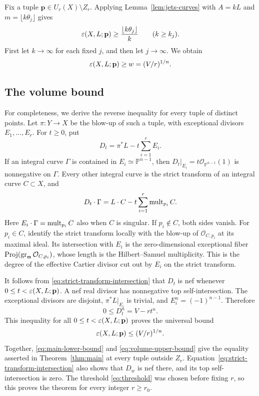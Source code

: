 Fix a tuple $\mathbf p\in U_r(X)\setminus Z_r$. Applying
Lemma~\ref{lem:jets-curves} with $A=kL$ and
$m=\lfloor k\theta_j\rfloor$ gives
\[
 \varepsilon(X,L;\mathbf p)\ge\frac{\lfloor k\theta_j\rfloor}{k}
 \qquad(k\ge k_j).
\]
First let $k\to\infty$ for each fixed $j$, and then let $j\to\infty$.
We obtain
\begin{equation}
 \label{eq:main-lower-bound}
 \varepsilon(X,L;\mathbf p)\ge w=(V/r)^{1/n}.
\end{equation}

\subsection{The volume bound}

For completeness, we derive the reverse inequality for every tuple of
distinct points. Let $\pi:Y\to X$ be the blow-up of such a tuple, with
exceptional divisors $E_1,\ldots,E_r$. For $t\ge0$, put
\[
 D_t=\pi^*L-t\sum_{i=1}^r E_i.
\]
If an integral curve $\Gamma$ is contained in $E_i\simeq\mathbb P^{n-1}$,
then $D_t|_{E_i}=t\mathcal O_{\mathbb P^{n-1}}(1)$ is nonnegative on
$\Gamma$. Every other integral curve is the strict transform of an
integral curve $C\subset X$, and
\begin{equation}
 \label{eq:strict-transform-intersection}
 D_t\cdot\Gamma=L\cdot C-t\sum_{i=1}^r\operatorname{mult}_{p_i}C.
\end{equation}
Here $E_i\cdot\Gamma=\operatorname{mult}_{p_i}C$ also when $C$ is singular. If
$p_i\notin C$, both sides vanish. For $p_i\in C$, identify the strict
transform locally with the blow-up of $\mathcal O_{C,p_i}$ at its maximal
ideal. Its intersection
with $E_i$ is the zero-dimensional exceptional fiber
$\operatorname{Proj}(\operatorname{gr}_{\mathfrak m}\mathcal O_{C,p_i})$,
whose length is the Hilbert--Samuel multiplicity. This is the degree of
the effective Cartier divisor cut out by $E_i$ on the strict transform.

It follows from \eqref{eq:strict-transform-intersection} that $D_t$ is
nef whenever $0\le t<\varepsilon(X,L;\mathbf p)$. A nef real divisor has
nonnegative top self-intersection. The exceptional divisors are disjoint,
$\pi^*L|_{E_i}$ is trivial, and $E_i^n=(-1)^{n-1}$. Therefore
\[
 0\le D_t^n=V-rt^n.
\]
This inequality for all $0\le t<\varepsilon(X,L;\mathbf p)$ proves the universal
bound
\begin{equation}
 \label{eq:volume-upper-bound}
 \varepsilon(X,L;\mathbf p)\le(V/r)^{1/n}.
\end{equation}
Together, \eqref{eq:main-lower-bound} and \eqref{eq:volume-upper-bound}
give the equality asserted in Theorem~\ref{thm:main} at every tuple outside
$Z_r$. Equation~\eqref{eq:strict-transform-intersection} also shows that
$D_w$ is nef there, and its top self-intersection is zero. The threshold
\eqref{eq:threshold} was chosen before fixing $r$, so this proves the
theorem for every integer $r\ge r_0$.
